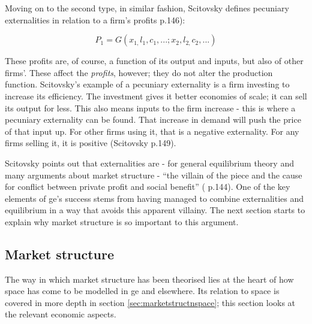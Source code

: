 Moving on to the second type, in similar fashion, Scitovsky defines pecuniary externalities in relation to a firm's profits \citealt{scitovsky_two_1954} p.146):

\begin{equation}
P_{1}=G(x_{1,}l_{1},c_{1},...;x_{2},l_{2,}c_{2},...)\label{eq:scit2}
\end{equation}

These profits are, of course, a function of its output and inputs, but also of other firms'. These affect the \emph{profits}, however; they do not alter the production function. Scitovsky's example of a pecuniary externality is a firm investing to increase its efficiency. The investment gives it better economies of scale; it can sell its output for less. This also means inputs to the firm increase - this is where a pecuniary externality can be found. That increase in demand will push the price of that input up. For other firms using it, that is a negative externality. For any firms selling it, it is positive (Scitovsky p.149).

Scitovsky points out that externalities are - for general equilibrium theory and many arguments about market structure - ``the villain of the piece and the cause for conflict between private profit and social benefit'' (\citealt{scitovsky_two_1954} p.144). One of the key elements of \gls{ge}'s success stems from having managed to combine externalities and equilibrium in a way that avoids this apparent villainy. The next section starts to explain why market structure is so important to this argument.

\subsection{Market structure \label{sec:marketstructure}}

The way in which market structure has been theorised lies at the heart of how space has come to be modelled in \gls{ge} and elsewhere. Its relation to space is covered in more depth in section \ref{sec:marketstructnspace}; this section looks at the relevant economic aspects.


